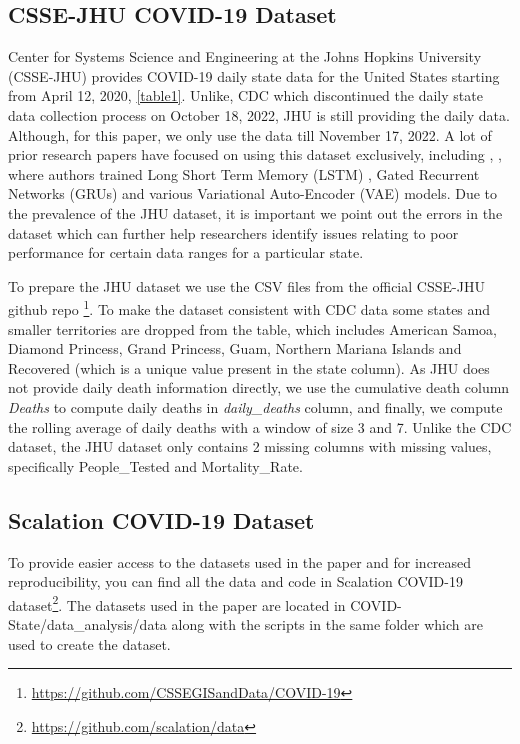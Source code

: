 \documentclass[11pt,twocolumn,letterpaper]{article}
\begin{document}
\subsection{CSSE-JHU COVID-19 Dataset}

Center for Systems Science and Engineering at the Johns Hopkins University (CSSE-JHU) provides COVID-19 daily state data for the United States starting from April 12, 2020, \cref{table1}. Unlike, CDC which discontinued the daily state data collection process on October 18, 2022, JHU is still providing the daily data. Although, for this paper, we only use the data till November 17, 2022. A lot of prior research papers have focused on using this dataset exclusively, including \cite{ref10}, \cite{ref11}, \cite{ref12} where authors trained Long Short Term Memory (LSTM) \cite{ref2}, Gated Recurrent Networks (GRUs) \cite{ref13} and various Variational Auto-Encoder (VAE) \cite{ref14} models. Due to the prevalence of the JHU dataset, it is important we point out the errors in the dataset which can further help researchers identify issues relating to poor performance for certain data ranges for a particular state.

To prepare the JHU dataset we use the CSV files from the official CSSE-JHU github repo \footnote{\href{https://github.com/CSSEGISandData/COVID-19}{https://github.com/CSSEGISandData/COVID-19}}. To make the dataset consistent with CDC data some states and smaller territories are dropped from the table, which includes American Samoa, Diamond Princess, Grand Princess, Guam, Northern Mariana Islands and Recovered (which is a unique value present in the state column). As JHU does not provide daily death information directly, we use the cumulative death column \emph{Deaths} to compute daily deaths in \emph{daily\_deaths} column, and finally, we compute the rolling average of daily deaths with a window of size 3 and 7. Unlike the CDC dataset, the JHU dataset only contains 2 missing columns with missing values, specifically People\_Tested and Mortality\_Rate.

\subsection{Scalation COVID-19 Dataset}

To provide easier access to the datasets used in the paper and for increased reproducibility, you can find all the data and code in Scalation \cite{ref15} COVID-19 dataset\footnote{\href{https://github.com/scalation/data}{https://github.com/scalation/data}}. The datasets used in the paper are located in COVID-State/data\_analysis/data along with the scripts in the same folder which are used to create the dataset.
\end{document}
